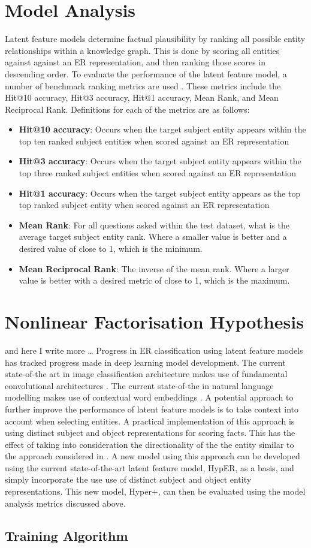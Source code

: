 \section{Model Analysis}
Latent feature models determine factual plausibility by ranking all possible entity relationships within a knowledge graph. This is done by scoring all entities against against an ER representation, and then ranking those scores in descending order. To evaluate the performance of the latent feature model, a number of benchmark ranking metrics are used \cite{reference}. These metrics include the Hit@10 accuracy, Hit@3 accuracy, Hit@1 accuracy, Mean Rank, and Mean Reciprocal Rank. Definitions for each of the metrics are as follows:
\begin{itemize}
	\item \textbf{Hit@10 accuracy}: Occurs when the target subject entity appears within the top ten ranked subject entities when scored against an ER representation
	\item \textbf{Hit@3 accuracy}: Occurs when the target subject entity appears within the top three ranked subject entities when scored against an ER representation
	\item \textbf{Hit@1 accuracy}: Occurs when the target subject entity appears as the top top ranked subject entity when scored against an ER representation
	\item \textbf{Mean Rank}: For all questions asked within the test dataset, what is the average target subject entity rank. Where a smaller value is better and a desired value of close to 1, which is the minimum.
	\item \textbf{Mean Reciprocal Rank}: The inverse of the mean rank. Where a larger value is better with a desired metric of close to 1, which is the maximum.
\end{itemize}

\section{Nonlinear Factorisation Hypothesis}
and here I write more \dots
Progress in ER classification using latent feature models has tracked progress made in deep learning model development. The current state-of-the art in image classification architecture makes use of fundamental convolutional architectures \cite{reference}. The current state-of-the in natural language modelling makes use of contextual word embeddings \cite{reference}. A potential approach to further improve the performance of latent feature models is to take context into account when selecting entities. A practical implementation of this approach is using distinct subject and object representations for scoring facts. This has the effect of taking into consideration the directionality of the the entity similar to the approach considered in \cite{Deep Knowledge Models}. A new model using this approach can be developed using the current state-of-the-art latent feature model, HypER, as a basis, and simply incorporate the use use of distinct subject and object entity representations. This new model, Hyper+, can then be evaluated using the model analysis metrics discussed above. 

\subsection{Training Algorithm}

